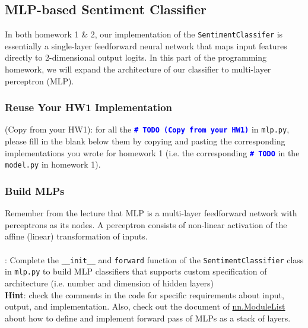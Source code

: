 \subsection{MLP-based Sentiment Classifier}
In both homework 1 \& 2, our implementation of the \texttt{SentimentClassifer} is essentially a single-layer feedforward neural network that maps input features directly to 2-dimensional output logits. In this part of the programming homework, we will expand the architecture of our classifier to multi-layer perceptron (MLP). 

\subsubsection{Reuse Your HW1 Implementation}
\todo{} (Copy from your HW1): for all the \textcolor{blue}{\texttt{\textbf{\#~TODO (Copy from your HW1)}}} in \texttt{mlp.py}, please fill in the blank below them by copying and pasting the corresponding implementations you wrote for homework 1 (i.e. the corresponding \textcolor{blue}{\texttt{\textbf{\#~TODO}}} in the \texttt{model.py} in homework 1).

\subsubsection{Build MLPs}
\label{subsubsec: build mlps}
Remember from the lecture that MLP is a multi-layer feedforward network with perceptrons as its nodes. A perceptron consists of non-linear activation of the affine (linear) transformation of inputs.
\\\\
\noindent \todo{}: Complete the \texttt{\_\_init\_\_} and \texttt{forward} function of the \texttt{SentimentClassifier} class in \texttt{mlp.py} to build MLP classifiers that supports custom specification of architecture (i.e. number and dimension of hidden layers)\\
\noindent \textbf{Hint}: check the comments in the code for specific requirements about input, output, and implementation. Also, check out the document of \href{https://pytorch.org/docs/stable/generated/torch.nn.ModuleList.html}{nn.ModuleList} about how to define and implement forward pass of MLPs as a stack of layers.

